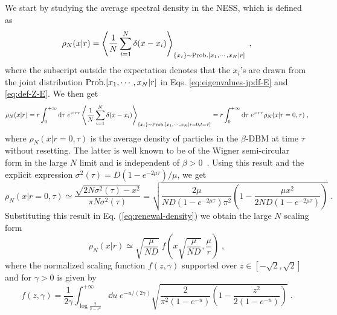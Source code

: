 \documentclass[onecolumn,superscriptaddress,
 amsmath,amssymb,
 aps,
 prd,
]{revtex4-1}
\begin{document}
{We start by studying the average spectral density in the NESS, which is defined as
\begin{equation} \label{eq:def-rho}
\rho_N(x | r) = \left\langle \frac{1}{N} \sum_{i = 1}^N \delta(x - x_i) \right\rangle_{\{x_i\} \sim {\rm Prob.}[x_1, \cdots, x_N | r]} \;,
\end{equation}
where the subscript outside the expectation denotes that the $x_i$'s are drawn from the joint distribution ${\rm Prob.}[x_1, \cdots, x_N | r]$ in 
Eqs. \eqref{eq:eigenvalues-jpdf-E} and \eqref{eq:def-Z-E}. We then get
\begin{equation} \label{eq:renewal-density}
\rho_N(x | r) = r \int_0^{+\infty} \dd \tau \; e^{-r \tau} \left\langle \frac{1}{N} \sum_{i = 1}^N \delta(x - x_i) \right\rangle_{\{x_i\} \sim {\rm Prob.}[x_1, \cdots, x_N | r = 0, t = \tau]} = r \int_0^{+\infty} \dd \tau \; e^{-r \tau} \rho_N(x | r = 0, \tau) \;,
\end{equation}
where $\rho_N(x | r = 0, \tau)$ is the average density of particles in the $\beta$-DBM at time $\tau$ without resetting. The latter is well known to be of the Wigner semi-circular form in the large $N$ limit and is independent of $\beta>0$~\cite{M91, PB20}. Using this result and the explicit expression $\sigma^2(\tau) = D(1-e^{-2\mu \tau})/\mu$, we get
{
\begin{equation} \label{eq:free-density}
\rho_N(x | r = 0, \tau) \simeq \frac{\sqrt{2 N \sigma^2(\tau) - x^2}}{\pi N \sigma^2(\tau)} = \sqrt{\frac{2 \mu}{N D (1 - e^{- 2 \mu \tau })\pi^2}\left(1 - \frac{\mu x^2}{ 2 N D ( 1 - e^{-2 \mu \tau} ) }\right)} \;.
\end{equation}
}
Substituting this result in Eq. (\ref{eq:renewal-density}) we obtain the large $N$ scaling form
\begin{equation}\label{eq:density-scaling}
\rho_N(x | r) \simeq \sqrt{\frac{\mu}{N D}} \; f\left(x \sqrt{\frac{\mu}{N D}}, \frac{\mu}{r}\right) \;,
\end{equation}
where the normalized scaling function $f(z, \gamma)$ supported over $z \in [-\sqrt{2}, \sqrt{2}]$ and for $\gamma > 0$ is given by
\begin{equation} \label{eq:def-f}
f(z, \gamma) = \frac{1}{2 \gamma} \int_{\log\frac{2}{2 - z^2}}^{+\infty} \dd u \; e^{- u/(2 \gamma)} \sqrt{\frac{2}{\pi^2 ( 1 - e^{-u} )}\left( 1 - \frac{z^2}{2 (1 - e^{-u})} \right)} \;.
\end{equation}
}
\end{document}
